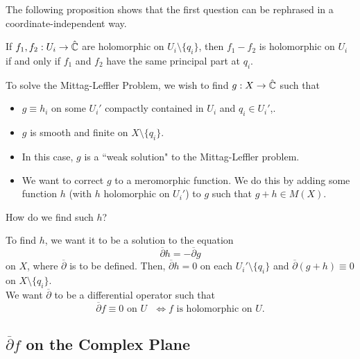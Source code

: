 \documentclass{article}
\begin{document}
{The following proposition shows that the first question can be rephrased in a coordinate-independent way.
\begin{proposition}
    If $f_1, f_2: U_i \to \hat{\mathbb{C}}$ are holomorphic on $U_i \setminus \{q_i\}$, then $f_1 - f_2$ is holomorphic on $U_i$ if and only if $f_1$ and $f_2$ have the same principal part at $q_i$.
\end{proposition}

To solve the Mittag-Leffler Problem, we wish to find $g: X \to \hat{\mathbb{C}}$ such that
\begin{itemize}
    \item $g \equiv h_i$ on some $U_i'$ compactly contained in $U_i$ and $q_i \in U_i'$,.
    \item $g$ is smooth and finite on $X \setminus \{q_i\}$.
    \item In this case, $g$ is a ``weak solution" to the Mittag-Leffler problem.
    \item We want to correct $g$ to a meromorphic function. We do this by adding some function $h$ (with $h$ holomorphic on $U_i'$) to $g$ such that $g + h \in M(X)$.
\end{itemize}

\begin{question}
    How do we find such $h$?
\end{question}

To find $h$, we want it to be a solution to the equation
\[\overline{\partial} h = - \overline{\partial} g\]
on $X$, where $\overline{\partial}$ is to be defined. Then, $\overline{\partial} h  = 0$ on each $U_i' \setminus \{q_i\}$ and $\overline{\partial}(g + h) \equiv 0$ on $X \setminus \{q_i\}$.\\

We want $\overline{\partial}$ to be a differential operator such that 
\[\overline{\partial} f \equiv 0 \text{ on $U$ } \iff f \text{ is holomorphic on } U.\]

\subsection{$\overline{\partial} f$ on the Complex Plane}

}
\end{document}
